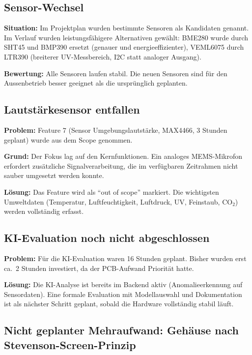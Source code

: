 \documentclass[11pt,a4paper]{scrartcl}
\begin{document}
\subsection{Sensor-Wechsel}

\textbf{Situation:} Im Projektplan wurden bestimmte Sensoren als Kandidaten genannt.
Im Verlauf wurden leistungsfähigere Alternativen gewählt: BME280 wurde durch SHT45
und BMP390 ersetzt (genauer und energieeffizienter), VEML6075 durch LTR390
(breiterer UV-Messbereich, I2C statt analoger Ausgang).

\textbf{Bewertung:} Alle Sensoren laufen stabil. Die neuen Sensoren sind für den
Aussenbetrieb besser geeignet als die ursprünglich geplanten.

\subsection{Lautstärkesensor entfallen}

\textbf{Problem:} Feature 7 (Sensor Umgebungslautstärke, MAX4466, 3 Stunden geplant)
wurde aus dem Scope genommen.

\textbf{Grund:} Der Fokus lag auf den Kernfunktionen. Ein analoges MEMS-Mikrofon
erfordert zusätzliche Signalverarbeitung, die im verfügbaren Zeitrahmen nicht
sauber umgesetzt werden konnte.

\textbf{Lösung:} Das Feature wird als ``out of scope'' markiert. Die wichtigsten
Umweltdaten (Temperatur, Luftfeuchtigkeit, Luftdruck, UV, Feinstaub, CO${}_2$)
werden vollständig erfasst.

\subsection{KI-Evaluation noch nicht abgeschlossen}

\textbf{Problem:} Für die KI-Evaluation waren 16 Stunden geplant. Bisher wurden
erst ca.\ 2 Stunden investiert, da der PCB-Aufwand Priorität hatte.

\textbf{Lösung:} Die KI-Analyse ist bereits im Backend aktiv (Anomalieerkennung auf
Sensordaten). Eine formale Evaluation mit Modellauswahl und Dokumentation ist als
nächster Schritt geplant, sobald die Hardware vollständig stabil läuft.

\subsection{Nicht geplanter Mehraufwand: Gehäuse nach Stevenson-Screen-Prinzip}
\end{document}

